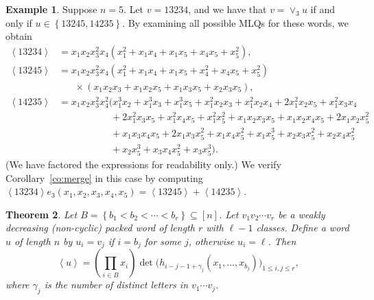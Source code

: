 \documentclass[reqno]{amsart}
\newcommand{\0}{\phantom{c}}
\newcommand{\swt}[1]{\left\langle #1 \right\rangle} %
\newcommand{\merge}[1]{\vee_{#1}} %
\let\prodnonlimits\prod
\renewcommand{\prod}{\prodnonlimits\limits}
\newcommand{\set}[1]{\left\{ #1 \right\}}
\newcommand{\ive}[1]{\left[ #1 \right]}
\theoremstyle{plain}
\newtheorem{thm}{Theorem}[section]
\theoremstyle{definition}
\newtheorem{example}[thm]{Example}
\numberwithin{equation}{section}
\begin{document}
\begin{example}
Suppose $n = 5$.
Let $v = 13234$, and we have that $v = \merge{3} u$ if and only if $u \in \set{13245, 14235}$.
By examining all possible MLQs for these words, we obtain
\begin{align*}
\swt{13234} & = x_1 x_2 x_3^2 x_4 (x_1^2 + x_1 x_4 + x_1 x_5 + x_4 x_5 + x_5^2),
\\ \swt{13245} & = x_1 x_2 x_3^2 x_4 (x_1^2 + x_1x_4 + x_1x_5 + x_4^2 + x_4x_5 + x_5^2)
\\ & \hspace{20pt} \times (x_1x_2x_3 + x_1x_2x_5+x_1x_3x_5+x_2x_3x_5),
\\ \swt{14235} & = x_1x_2x_3^2x_4^2 (x_1^3x_2 + x_1^3x_3 + x_1^3x_5 + x_1^2x_2x_3 + x_1^2x_2x_4 + 2x_1^2x_2x_5 + x_1^2x_3x_4
\\ & \hspace{65pt} + 2x_1^2x_3x_5 + x_1^2x_4x_5 + x_1^2x_5^2 + x_1x_2x_3x_5 + x_1x_2x_4x_5 + 2x_1x_2x_5^2
\\ & \hspace{65pt} + x_1x_3x_4x_5 + 2x_1x_3x_5^2 + x_1x_4x_5^2 + x_1x_5^3 + x_2x_3x_5^2 + x_2x_4x_5^2
\\ & \hspace{65pt} + x_2x_5^3 + x_3x_4x_5^2 + x_3x_5^3).
\end{align*}
(We have factored the expressions for readability only.)
We verify Corollary~\ref{co:merge} in this case by computing $\swt{13234} e_3(x_1, x_2, x_3, x_4, x_5) = \swt{13245} + \swt{14235}$.
\end{example}


\begin{thm}
\label{thm:determinant_form}
  Let $B = \set{b_1 < b_2 < \cdots < b_r} \subseteq \ive{n}$.
  Let $v_1v_2 \dotsm v_r$ be a weakly decreasing (non-cyclic) packed word of length $r$ with $\ell-1$ classes.
  Define a word $u$ of length $n$ by $u_i = v_j$ if $i = b_j$ for some $j$, otherwise $u_i = \ell$.
  Then
  \[
  \swt{u} = \left( \prod_{i\in B} x_i \right) \det\bigl( h_{i-j-1+\gamma_j}(x_1, \dotsc, x_{b_j}) \bigr)_{1\leq i,j\leq r},
  \]
  where $\gamma_j$ is the number of distinct letters in $v_1 \dotsm v_j$.
\end{thm}
\end{document}
